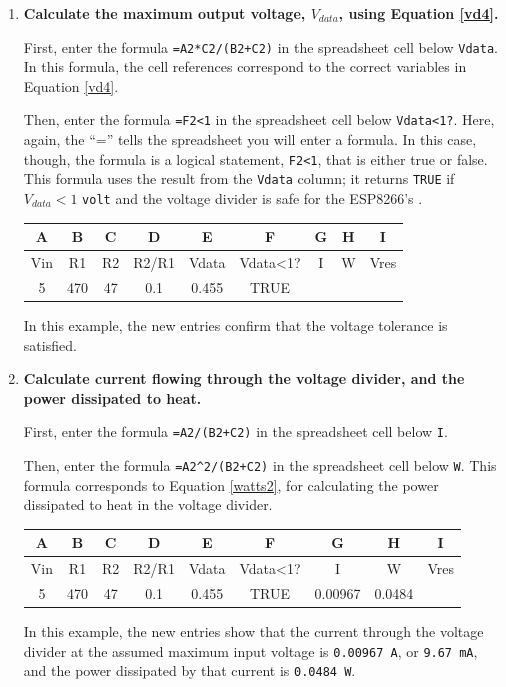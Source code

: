 \begin{enumerate}
	\item \textbf{Calculate the maximum output voltage, $V_{data}$, using Equation \ref{vd4}.}

	First, enter the formula \lstinline{=A2*C2/(B2+C2)} in the spreadsheet cell below \texttt{Vdata}.
	In this formula, the cell references correspond to the correct variables in Equation \ref{vd4}.

	Then, enter the formula \lstinline{=F2<1} in the spreadsheet cell below \texttt{Vdata<1?}.
	Here, again, the  ``='' tells the spreadsheet you will enter a formula.
	In this case, though, the formula is a logical statement, \lstinline{F2<1}, that is either true or false.
	This formula uses the result from the \texttt{Vdata} column; it returns \texttt{TRUE} if $V_{data} < 1$ \texttt{volt} and the voltage divider is safe for the ESP8266's \adc. 
	\begin{table}[H]
	\centering \begin{small}
	\begin{tabular}{|c|c|c|c|c|c|c|c|c|}
		\hline 
		\textbf{A}  & \textbf{B} & \textbf{C} & \textbf{D} & \textbf{E} & \textbf{F} & \textbf{G} & \textbf{H} & \textbf{I} \\ 
		\hline 
		Vin  & R1 & R2 & R2/R1 & Vdata & Vdata<1? & I & W & Vres \\ 
		\hline 
		5 & 470  & 47 & 0.1 & 0.455 & TRUE &  &  &  \\ 
		\hline 
	\end{tabular} 
	\end{small}
	\end{table}
	In this example, the new entries confirm that the voltage tolerance is satisfied.

	\item \textbf{Calculate current flowing through the voltage divider, and the power dissipated to heat.}
	
	First, enter the formula \lstinline{=A2/(B2+C2)} in the spreadsheet cell below \texttt{I}.
	
	Then, enter the formula \lstinline{=A2^2/(B2+C2)} in the spreadsheet cell below \texttt{W}.
	This formula corresponds to Equation \ref{watts2}, for calculating the power dissipated to heat in the voltage divider.
	\begin{table}[H]
	\centering \begin{small}
	\begin{tabular}{|c|c|c|c|c|c|c|c|c|}
		\hline 
		\textbf{A}  & \textbf{B} & \textbf{C} & \textbf{D} & \textbf{E} & \textbf{F} & \textbf{G} & \textbf{H} & \textbf{I} \\ 
		\hline 
		Vin  & R1 & R2 & R2/R1 & Vdata & Vdata<1? & I & W & Vres \\ 
		\hline 
		5 & 470  & 47 & 0.1 & 0.455 & TRUE & 0.00967 & 0.0484 &  \\ 
		\hline 
	\end{tabular} 
	\end{small}
	\end{table}
	In this example, the new entries show that the current through the voltage divider at the assumed maximum input voltage is \texttt{0.00967 A}, or \texttt{9.67 mA}, and the power dissipated by that current is \texttt{0.0484 W}.


\end{enumerate}

